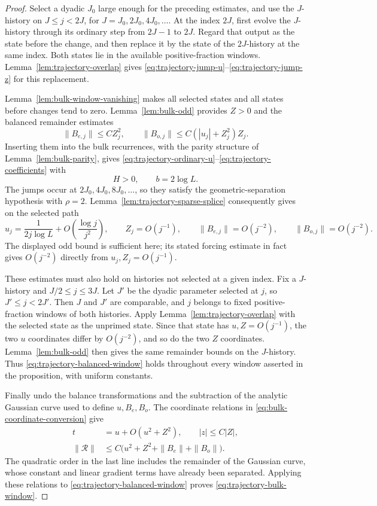 \begin{proof}
Select a dyadic $J_0$ large enough for the preceding estimates, and
use the $J$-history on $J\le j<2J$, for
$J=J_0,2J_0,4J_0,\ldots$.  At the index $2J$, first evolve the
$J$-history through its ordinary step from $2J-1$ to $2J$.  Regard
that output as the state before the change, and then replace it by
the state of the $2J$-history at the same index.  Both states lie in
the available positive-fraction windows.  Lemma~\ref{lem:trajectory-overlap}
gives \eqref{eq:trajectory-jump-u}--\eqref{eq:trajectory-jump-z} for
this replacement.

Lemma~\ref{lem:bulk-window-vanishing} makes all selected states and
all states before changes tend to zero.  Lemma~\ref{lem:bulk-odd}
provides $Z>0$ and the balanced remainder estimates
\[
 \|B_{e,j}\|\le CZ_j^2,
 \qquad
 \|B_{o,j}\|\le C(|u_j|+Z_j^2)Z_j.
\]
Inserting them into the bulk recurrences, with the parity structure
of Lemma~\ref{lem:bulk-parity}, gives
\eqref{eq:trajectory-ordinary-u}--\eqref{eq:trajectory-coefficients}
with
\[
 H>0,\qquad b=2\log L.
\]
The jumps occur at $2J_0,4J_0,8J_0,\ldots$, so they satisfy the
geometric-separation hypothesis with $\rho=2$.
Lemma~\ref{lem:trajectory-sparse-splice} consequently gives on the
selected path
\begin{equation}
 u_j=\frac1{2j\log L}
          +O\left(\frac{\log j}{j^2}\right),
 \qquad Z_j=O(j^{-1}),
 \qquad \|B_{e,j}\|=O(j^{-2}),
 \qquad \|B_{o,j}\|=O(j^{-2}).
 \label{eq:trajectory-balanced-window}
\end{equation}
The displayed odd bound is sufficient here; its stated forcing
estimate in fact gives $O(j^{-2})$ directly from $u_j,Z_j=O(j^{-1})$.

These estimates must also hold on histories not selected at a given
index.  Fix a $J$-history and $J/2\le j\le3J$.  Let $J'$ be the
dyadic parameter selected at $j$, so $J'\le j<2J'$.  Then $J$ and
$J'$ are comparable, and $j$ belongs to fixed positive-fraction
windows of both histories.  Apply
Lemma~\ref{lem:trajectory-overlap} with the selected state as the
unprimed state.  Since that state has $u,Z=O(j^{-1})$, the two
$u$ coordinates differ by $O(j^{-2})$, and so do the two $Z$
coordinates.  Lemma~\ref{lem:bulk-odd} then gives the same remainder
bounds on the $J$-history.  Thus
\eqref{eq:trajectory-balanced-window} holds throughout every
window asserted in the proposition, with uniform constants.

Finally undo the balance transformations and the subtraction of the
analytic Gaussian curve used to define $u,B_e,B_o$.  The coordinate
relations in \eqref{eq:bulk-coordinate-conversion} give
\begin{align*}
 t&=u+O(u^2+Z^2),\qquad |z|\le C|Z|,\\
 \|\mathcal R\|
   &\le C\bigl(u^2+Z^2+\|B_e\|+\|B_o\|\bigr).
\end{align*}
The quadratic order in the last line includes the remainder of the
Gaussian curve, whose constant and linear gradient terms have
already been separated.  Applying these relations to
\eqref{eq:trajectory-balanced-window} proves
\eqref{eq:trajectory-bulk-window}.
\end{proof}

